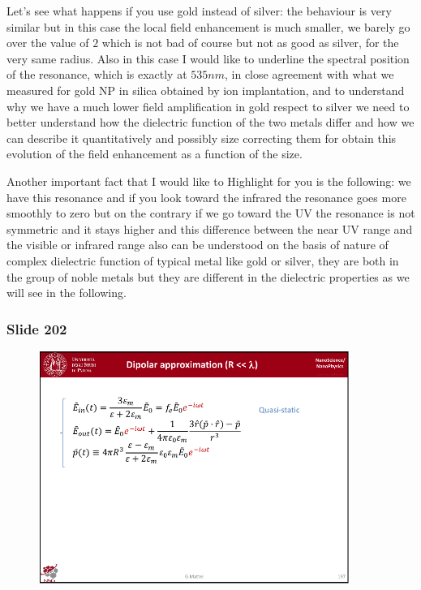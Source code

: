 \documentclass[../main/main.tex]{subfiles}
\begin{document}
Let's see what happens if you use gold instead of silver: the behaviour is very similar but in this case the local field enhancement is much smaller, we barely go over the value of $2$ which is not bad of course but not as good as silver, for the very same radius. Also in this case I would like to underline the spectral position of the resonance, which is exactly at $535 nm$, in close agreement with what we measured for gold NP in silica obtained by ion implantation, and to understand why we have a much lower field amplification in gold respect to silver we need to better understand how the dielectric function of the two metals differ and how we can describe it quantitatively and possibly size correcting them for obtain this evolution of the field enhancement as a function of the size. 

Another important fact that I would like to Highlight for you is the following: we have this resonance and if you look toward the infrared the resonance goes more smoothly to zero but on the contrary if we go toward the UV the resonance is not symmetric and it stays higher and this difference between the near UV range and the visible or infrared range also can be understood on the basis of nature of complex dielectric function of typical metal like gold or silver, they are both in the group of noble metals but they are different in the dielectric properties as we will see in the following.



\newpage

\subsubsection{Slide 202}

\begin{figure}[h!]
\centering
\includegraphics[page=6,width=0.9\textwidth]{../lessons/pdf_file/12_lesson.pdf}
\end{figure}
\end{document}
